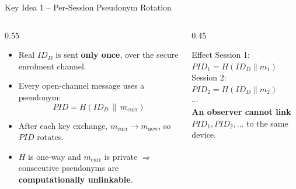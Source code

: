 \begin{frame}{Key Idea 1 -- Per-Session Pseudonym Rotation}
    \begin{columns}
        \begin{column}{0.55\textwidth}
            \begin{itemize}
                \item Real $ID_D$ is sent \textbf{only once}, over the secure enrolment channel.
                \item Every open-channel message uses a pseudonym:
                $$\mathit{PID} = H(ID_D \,\|\, m_{\mathrm{curr}})$$
                \item After each key exchange, $m_{\mathrm{curr}} \!\rightarrow\! m_{\mathrm{new}}$,
                so $\mathit{PID}$ rotates.
                \item $H$ is one-way and $m_{\mathrm{curr}}$ is private $\Rightarrow$
                consecutive pseudonyms are \textbf{computationally unlinkable}.
            \end{itemize}
        \end{column}
        \begin{column}{0.45\textwidth}
            \begin{block}{Effect}
                \centering
                \footnotesize
                Session 1: $\mathit{PID}_1 = H(ID_D \| m_1)$ \\[0.2cm]
                Session 2: $\mathit{PID}_2 = H(ID_D \| m_2)$ \\[0.2cm]
                $\cdots$ \\[0.2cm]
                \textbf{An observer cannot link}
                $\mathit{PID}_1, \mathit{PID}_2, \ldots$ to the same device.
            \end{block}
        \end{column}
    \end{columns}
\end{frame}

